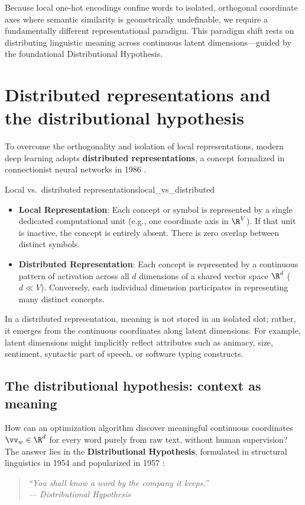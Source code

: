 \documentclass[../../main.tex]{subfiles}
\begin{document}
Because local one-hot encodings confine words to isolated, orthogonal coordinate axes where semantic similarity is geometrically undefinable, we require a fundamentally different representational paradigm. This paradigm shift rests on distributing linguistic meaning across continuous latent dimensions---guided by the foundational Distributional Hypothesis.

\section{Distributed representations and the distributional hypothesis}
\label{sec:distributed_representations}

To overcome the orthogonality and isolation of local representations, modern deep learning adopts \textbf{distributed representations}, a concept formalized in connectionist neural networks in 1986 \cite{rumelhart1986}.

\begin{definition}{Local vs.~distributed representations}{local_vs_distributed}
\begin{itemize}
    \item \textbf{Local Representation}: Each concept or symbol is represented by a single dedicated computational unit (e.g., one coordinate axis in $\R^V$). If that unit is inactive, the concept is entirely absent. There is zero overlap between distinct symbols.
    \item \textbf{Distributed Representation}: Each concept is represented by a continuous pattern of activation across all $d$ dimensions of a shared vector space $\R^d$ ($d \ll V$). Conversely, each individual dimension participates in representing many distinct concepts.
\end{itemize}
\end{definition}

In a distributed representation, meaning is not stored in an isolated slot; rather, it emerges from the continuous coordinates along latent dimensions. For example, latent dimensions might implicitly reflect attributes such as animacy, size, sentiment, syntactic part of speech, or software typing constructs.

\subsection{The distributional hypothesis: context as meaning}
\label{subsec:distributional_hypothesis}

How can an optimization algorithm discover meaningful continuous coordinates $\vv_w \in \R^d$ for every word purely from raw text, without human supervision? The answer lies in the \textbf{Distributional Hypothesis}, formulated in structural linguistics in 1954 \cite{harris1954} and popularized in 1957 \cite{firth1957}:
\begin{quote}
\centering
\itshape
``You shall know a word by the company it keeps.''\\
\upshape\hfill--- Distributional Hypothesis \cite{firth1957}
\end{quote}
\end{document}
